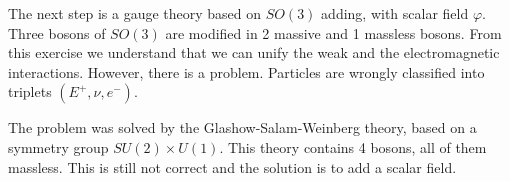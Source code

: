 \documentclass[../../main/main.tex]{subfiles}
\begin{document}
The next step is a gauge theory based on \( SO(3) \) adding, with scalar field \( \varphi \). Three bosons of \( SO(3) \) are modified in 2 massive and 1 massless bosons. From this exercise we understand that we can unify the weak and the electromagnetic interactions. However, there is a problem. Particles are wrongly classified into triplets \( (E^+, \nu, e^-) \).

The problem was solved by the Glashow-Salam-Weinberg theory, based on a symmetry group \( SU(2) \times U(1) \). This theory contains 4 bosons, all of them massless. This is still not correct and the solution is to add a scalar field.
\end{document}

